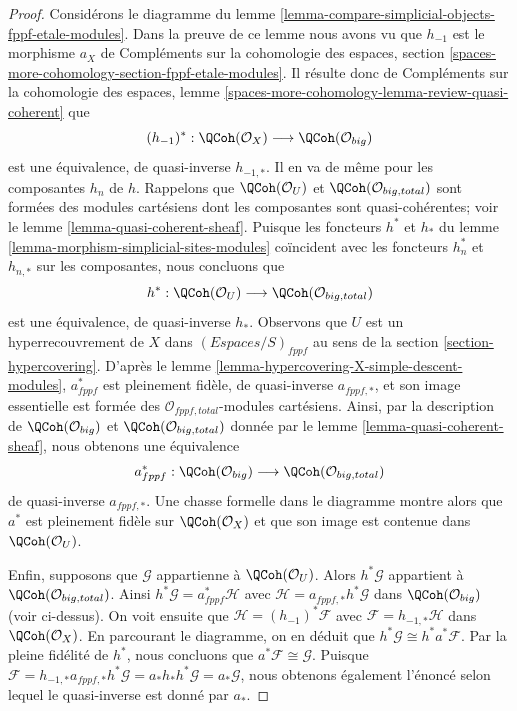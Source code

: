 \begin{proof}
Considérons le diagramme du lemme
\ref{lemma-compare-simplicial-objects-fppf-etale-modules}.
Dans la preuve de ce lemme nous avons vu que
$h_{-1}$ est le morphisme $a_X$ de
Compléments sur la cohomologie des espaces, section
\ref{spaces-more-cohomology-section-fppf-etale-modules}.
Il résulte donc de
Compléments sur la cohomologie des espaces, lemme
\ref{spaces-more-cohomology-lemma-review-quasi-coherent}
que
$$
(h_{-1})^* :
\QCoh(\mathcal{O}_X)
\longrightarrow
\QCoh(\mathcal{O}_{big})
$$
est une équivalence, de quasi-inverse $h_{-1, *}$.
Il en va de même pour les composantes $h_n$ de $h$.
Rappelons que $\QCoh(\mathcal{O}_U)$ et $\QCoh(\mathcal{O}_{big, total})$
sont formées des modules cartésiens dont les composantes sont quasi-cohérentes; voir le
lemme \ref{lemma-quasi-coherent-sheaf}.
Puisque les foncteurs $h^*$ et $h_*$ du
lemme \ref{lemma-morphism-simplicial-sites-modules}
coïncident avec les foncteurs $h_n^*$ et $h_{n, *}$ sur les composantes,
nous concluons que
$$
h^* :
\QCoh(\mathcal{O}_U)
\longrightarrow 
\QCoh(\mathcal{O}_{big, total})
$$
est une équivalence, de quasi-inverse $h_*$.
Observons que $U$ est un hyperrecouvrement de $X$ dans $(\textit{Espaces}/S)_{fppf}$
au sens de la section \ref{section-hypercovering}.
D'après le lemme \ref{lemma-hypercovering-X-simple-descent-modules},
$a_{fppf}^*$ est pleinement fidèle, de quasi-inverse
$a_{fppf, *}$, et son image essentielle est formée des
$\mathcal{O}_{fppf, total}$-modules cartésiens.
Ainsi, par la description de $\QCoh(\mathcal{O}_{big})$ et
$\QCoh(\mathcal{O}_{big, total})$ donnée par le lemme \ref{lemma-quasi-coherent-sheaf},
nous obtenons une équivalence
$$
a_{fppf}^* :
\QCoh(\mathcal{O}_{big})
\longrightarrow
\QCoh(\mathcal{O}_{big, total})
$$
de quasi-inverse $a_{fppf, *}$.
Une chasse formelle dans le diagramme montre alors que
$a^*$ est pleinement fidèle sur $\QCoh(\mathcal{O}_X)$ et que son image est
contenue dans $\QCoh(\mathcal{O}_U)$.

\medskip\noindent
Enfin, supposons que $\mathcal{G}$ appartienne à $\QCoh(\mathcal{O}_U)$.
Alors $h^*\mathcal{G}$ appartient à $\QCoh(\mathcal{O}_{big, total})$.
Ainsi $h^*\mathcal{G} = a_{fppf}^*\mathcal{H}$ avec
$\mathcal{H} = a_{fppf, *}h^*\mathcal{G}$
dans $\QCoh(\mathcal{O}_{big})$ (voir ci-dessus).
On voit ensuite que $\mathcal{H} = (h_{-1})^*\mathcal{F}$
avec $\mathcal{F} = h_{-1, *}\mathcal{H}$ dans $\QCoh(\mathcal{O}_X)$.
En parcourant le diagramme, on en déduit que
$h^*\mathcal{G} \cong h^*a^*\mathcal{F}$.
Par la pleine fidélité de $h^*$, nous concluons que
$a^*\mathcal{F} \cong \mathcal{G}$.
Puisque $\mathcal{F} = h_{-1, *}a_{fppf, *}h^*\mathcal{G} =
a_*h_*h^*\mathcal{G} = a_*\mathcal{G}$, nous obtenons également
l'énoncé selon lequel le quasi-inverse est donné par $a_*$.
\end{proof}

